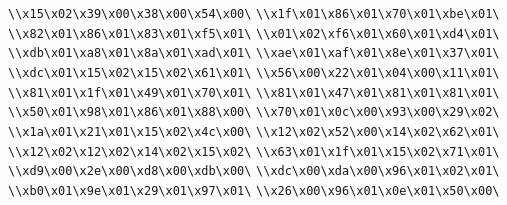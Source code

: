 \verb|\\x15\x02\x39\x00\x38\x00\x54\x00\|\newline
\verb|\\x1f\x01\x86\x01\x70\x01\xbe\x01\|\newline
\verb|\\x82\x01\x86\x01\x83\x01\xf5\x01\|\newline
\verb|\\x01\x02\xf6\x01\x60\x01\xd4\x01\|\newline
\verb|\\xdb\x01\xa8\x01\x8a\x01\xad\x01\|\newline
\verb|\\xae\x01\xaf\x01\x8e\x01\x37\x01\|\newline
\verb|\\xdc\x01\x15\x02\x15\x02\x61\x01\|\newline
\verb|\\x56\x00\x22\x01\x04\x00\x11\x01\|\newline
\verb|\\x81\x01\x1f\x01\x49\x01\x70\x01\|\newline
\verb|\\x81\x01\x47\x01\x81\x01\x81\x01\|\newline
\verb|\\x50\x01\x98\x01\x86\x01\x88\x00\|\newline
\verb|\\x70\x01\x0c\x00\x93\x00\x29\x02\|\newline
\verb|\\x1a\x01\x21\x01\x15\x02\x4c\x00\|\newline
\verb|\\x12\x02\x52\x00\x14\x02\x62\x01\|\newline
\verb|\\x12\x02\x12\x02\x14\x02\x15\x02\|\newline
\verb|\\x63\x01\x1f\x01\x15\x02\x71\x01\|\newline
\verb|\\xd9\x00\x2e\x00\xd8\x00\xdb\x00\|\newline
\verb|\\xdc\x00\xda\x00\x96\x01\x02\x01\|\newline
\verb|\\xb0\x01\x9e\x01\x29\x01\x97\x01\|\newline
\verb|\\x26\x00\x96\x01\x0e\x01\x50\x00\|\newline
